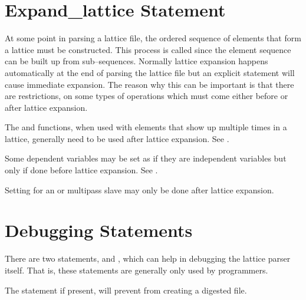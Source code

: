 \section{Expand\_lattice Statement}
\label{s:lat_expand}

At some point in parsing a lattice file, the ordered sequence of
elements that form a lattice must be constructed. This process is
called  since the element sequence can be built
up from sub--sequences. Normally lattice expansion happens
automatically at the end of parsing the lattice file but an explicit
 statement will cause immediate expansion. The
reason why this can be important is that there are restrictions, on
some types of operations which must come either before or after
lattice expansion. 
\begin{Itemize}
\item 
{}
The  and  functions, when used with elements
that show up multiple times in a lattice, generally need to be used
after lattice expansion. See .
\item 
Some dependent variables may be set as if they are independent
variables but only if done before lattice expansion. See
.
\item 
Setting  for an  or  multipass
slave may only be done after lattice expansion.
\end{Itemize}

\section{Debugging Statements}

There are two statements,  and ,
which can help in debugging the \bmad lattice parser
itself.  That is, these statements are generally only used by programmers.

The  statement if present, will prevent \bmad from 
creating a digested file. 

